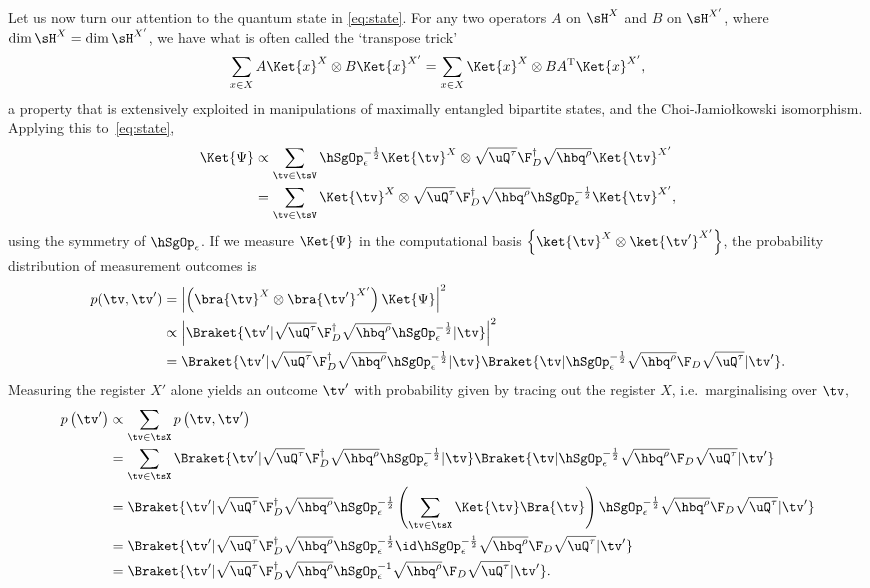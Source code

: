 Let us now turn our attention to the quantum state in \cref{eq:state}. For any two operators $A$ on $\sH^X$ and $B$ on $\sH^{X'}$, where $\dim\sH^X=\dim\sH^{X'}$, we have what is often called the `transpose trick'~\cite{Nielsen2010}
\begin{equation}
  \sum_{x\in X}A\Ket{x}^X\otimes B\Ket{x}^{X'}=\sum_{x\in X}\Ket{x}^X\otimes BA^\mathrm{T}\Ket{x}^{X'},
\end{equation}
a property that is extensively exploited in manipulations of maximally entangled bipartite states, and the Choi-Jamio{\l}kowski isomorphism.
Applying this to~\cref{eq:state}, 
\begin{align}
  \Ket{\Psi}&\propto\sum_{\tv\in\tsV}\hSgOp_\epsilon^{-\frac{1}{2}}\Ket{\tv}^X\otimes \sqrt{\uQ^{\tau}}\F_{D}^\dag\sqrt{\hbq^{\rho}}\Ket{\tv}^{X'}\nonumber\\
  &=\sum_{\tv\in\tsV}\Ket{\tv}^X\otimes \sqrt{\uQ^{\tau}}\F_{D}^\dag\sqrt{\hbq^{\rho}}\hSgOp_\epsilon^{-\frac{1}{2}}\Ket{\tv}^{X'},
\end{align}
using the symmetry of $\hSgOp_\epsilon$.
If we measure $\Ket{\Psi}$ in the computational basis $\left\{\ket{\tv}^X\otimes\ket{\tv'}^{X'}\right\}$, the probability distribution of measurement outcomes is
\begin{align}
  p(\tv,\tv')&=\left|\left(\bra{\tv}^X\otimes\bra{\tv'}^{X'}\right)\Ket{\Psi}\right|^2\nonumber\\
               &\propto\left|\Braket{\tv'|\sqrt{\uQ^{\tau}}\F_{D}^\dag\sqrt{\hbq^{\rho}}\hSgOp_\epsilon^{-\frac{1}{2}}|{\tv}}\right|^2\nonumber\\
               &=\Braket{\tv'|\sqrt{\uQ^{\tau}}\F_{D}^\dag\sqrt{\hbq^{\rho}}\hSgOp_\epsilon^{-\frac{1}{2}}|\tv}\Braket{\tv|\hSgOp_\epsilon^{-\frac{1}{2}}\sqrt{\hbq^{\rho}}\F_{D}\sqrt{\uQ^{\tau}}|\tv'}.
\end{align}
Measuring the register $X'$ alone yields an outcome $\tv'$ with probability given by tracing out the register $X$, i.e.\ marginalising over $\tv$,
\begin{align}
  \label{eq:p_tilde_x}
  p\left(\tv'\right)&\propto \sum_{\tv\in\tsX}p\left(\tv,\tv'\right) \nonumber\\
                              &=\sum_{\tv\in\tsX}\Braket{\tv'|\sqrt{\uQ^{\tau}}\F_{D}^\dag\sqrt{\hbq^{\rho}}\hSgOp_\epsilon^{-\frac{1}{2}}|\tv}\Braket{\tv|\hSgOp_\epsilon^{-\frac{1}{2}}\sqrt{\hbq^{\rho}}\F_{D}\sqrt{\uQ^{\tau}}|\tv'}\nonumber\\
                                &=\Braket{\tv'|\sqrt{\uQ^{\tau}}\F_{D}^\dag\sqrt{\hbq^{\rho}}\hSgOp_\epsilon^{-\frac{1}{2}}\left(\sum_{\tv\in\tsX}\Ket{\tv}\Bra{\tv}\right)\hSgOp_\epsilon^{-\frac{1}{2}}\sqrt{\hbq^{\rho}}\F_{D}\sqrt{\uQ^{\tau}}|\tv'}\nonumber\\
                                &=\Braket{\tv'|\sqrt{\uQ^{\tau}}\F_{D}^\dag\sqrt{\hbq^{\rho}}\hSgOp_\epsilon^{-\frac{1}{2}}\id\hSgOp_\epsilon^{-\frac{1}{2}}\sqrt{\hbq^{\rho}}\F_{D}\sqrt{\uQ^{\tau}}|\tv'}\nonumber\\
                                &=\Braket{\tv'|\sqrt{\uQ^{\tau}}\F_{D}^\dag\sqrt{\hbq^{\rho}}\hSgOp_\epsilon^{-1}\sqrt{\hbq^{\rho}}\F_{D}\sqrt{\uQ^{\tau}}|\tv'}.
\end{align}
